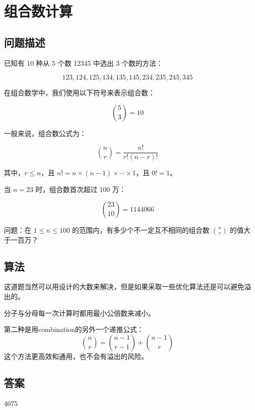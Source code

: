 \section{组合数计算}\label{sec:problem53}
\subsection{问题描述}
\begin{tcolorbox}
已知有 10 种从 5 个数 12345 中选出 3 个数的方法：

\[ 
123, 124, 125, 134, 135, 145, 234, 235, 245, 345 
\]

在组合数学中，我们使用以下符号来表示组合数：

\[
\binom{5}{3} = 10
\]

一般来说，组合数公式为：

\[
\binom{n}{r} = \frac{n!}{r!(n - r)!}
\]

其中，\(r \leq n\)，且 \(n! = n \times (n-1) \times \cdots \times 1\)，且 \(0! = 1\)。

当 \(n = 23\) 时，组合数首次超过 100 万：

\[
\binom{23}{10} = 1144066
\]

问题：在 \( 1 \leq n \leq 100 \) 的范围内，有多少个不一定互不相同的组合数 \( \binom{n}{r} \) 的值大于一百万？

\end{tcolorbox}

\subsection{算法}
这道题当然可以用设计的大数来解决，但是如果采取一些优化算法还是可以避免溢出的。

分子与分母每一次计算时都用最小公倍数来减小。

第二种是用combination的另外一个递推公式：
\begin{equation*}
\binom{n}{r}=\binom{n-1}{r-1}+\binom{n-1}{r}
\end{equation*}
这个方法更高效和通用，也不会有溢出的风险。
\subsection{答案}
4075
